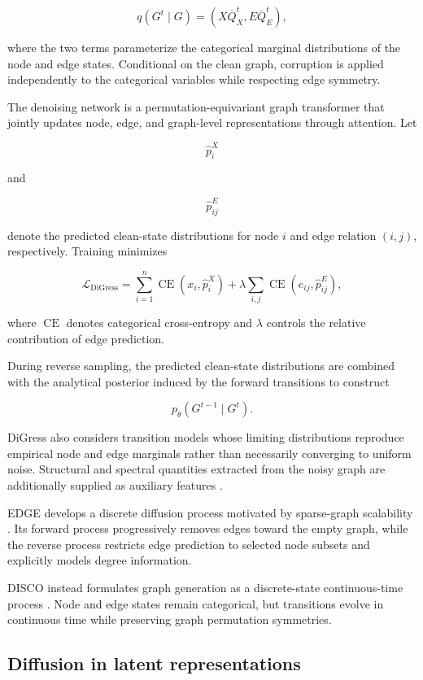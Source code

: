 \[
q(G^t\mid G)
=
\left(
X\overline{Q}_X^t,
E\overline{Q}_E^t
\right),
\]

where the two terms parameterize the categorical marginal distributions of the node and edge states. Conditional on the clean graph, corruption is applied independently to the categorical variables while respecting edge symmetry.

The denoising network is a permutation-equivariant graph transformer that jointly updates node, edge, and graph-level representations through attention. Let

\[
\hat{p}_i^X
\]

and

\[
\hat{p}_{ij}^E
\]

denote the predicted clean-state distributions for node \(i\) and edge relation \((i,j)\), respectively. Training minimizes

\[
\mathcal{L}_{\mathrm{DiGress}}
=
\sum_{i=1}^{n}
\operatorname{CE}
\left(
x_i,\hat{p}_i^X
\right)
+
\lambda
\sum_{i,j}
\operatorname{CE}
\left(
e_{ij},\hat{p}_{ij}^E
\right),
\]

where \(\operatorname{CE}\) denotes categorical cross-entropy and \(\lambda\) controls the relative contribution of edge prediction.

During reverse sampling, the predicted clean-state distributions are combined with the analytical posterior induced by the forward transitions to construct

\[
p_\theta
\left(
G^{t-1}\mid G^t
\right).
\]

DiGress also considers transition models whose limiting distributions reproduce empirical node and edge marginals rather than necessarily converging to uniform noise. Structural and spectral quantities extracted from the noisy graph are additionally supplied as auxiliary features \cite{vignac2023digress}.

EDGE develops a discrete diffusion process motivated by sparse-graph scalability \cite{chen2023efficient}. Its forward process progressively removes edges toward the empty graph, while the reverse process restricts edge prediction to selected node subsets and explicitly models degree information.

DISCO instead formulates graph generation as a discrete-state continuous-time process \cite{xu2024discrete}. Node and edge states remain categorical, but transitions evolve in continuous time while preserving graph permutation symmetries.


\subsection{Diffusion in latent representations}
\label{subsec:rw_latent_diffusion}

